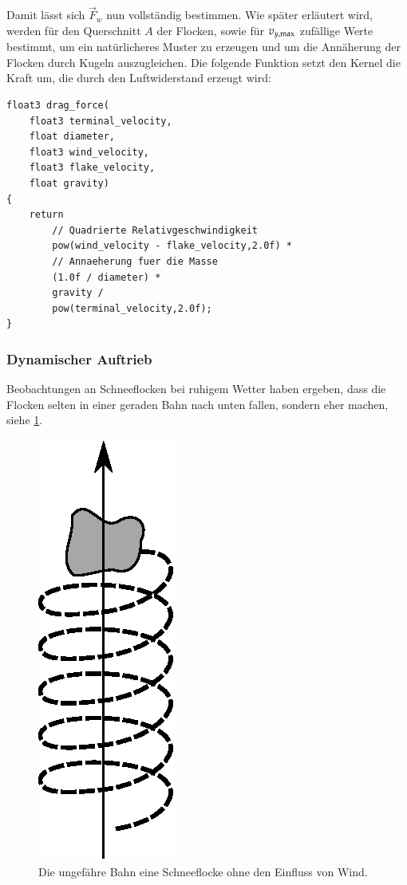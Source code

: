 Damit lässt sich $\vec{F}_w$ nun vollständig bestimmen. Wie später
erläutert wird, werden für den Querschnitt $A$ der Flocken, sowie für
$v_{y,\textnormal{max}}$ zufällige Werte bestimmt, um ein
natürlicheres Muster zu erzeugen und um die Annäherung der Flocken
durch Kugeln auszugleichen. Die folgende Funktion setzt den Kernel die
Kraft um, die durch den Luftwiderstand erzeugt wird:

\begin{verbatim}
float3 drag_force(
    float3 terminal_velocity,
    float diameter,
    float3 wind_velocity,
    float3 flake_velocity,
    float gravity)
{
    return
        // Quadrierte Relativgeschwindigkeit
        pow(wind_velocity - flake_velocity,2.0f) *
        // Annaeherung fuer die Masse
        (1.0f / diameter) *
        gravity /
        pow(terminal_velocity,2.0f);
}
\end{verbatim}

\subsubsection{Dynamischer Auftrieb}

Beobachtungen an Schneeflocken bei ruhigem Wetter haben ergeben, dass
die Flocken selten in einer geraden Bahn nach unten fallen, sondern
eher  machen, siehe
\cref{fig:implementation_snowflake_helix}.

\begin{figure}[ht]
    \centering
    \includegraphics{images/snowflake_spiral}
    \caption{Die ungefähre Bahn eine Schneeflocke ohne den Einfluss von Wind.}
    \label{fig:implementation_snowflake_helix}
\end{figure}

